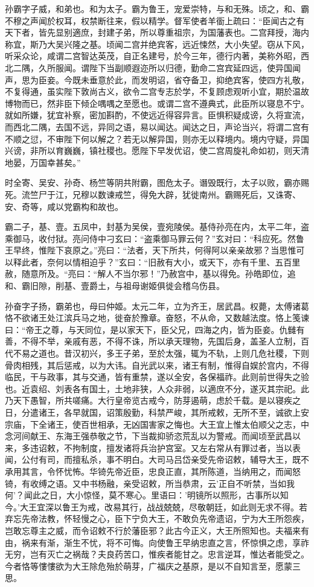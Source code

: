 \documentclass[12pt,UTF8]{ctexbook}
\begin{document}
孙霸字子威，和弟也。和为太子。霸为鲁王，宠爱崇特，与和无殊。顷之，和、霸不穆之声闻於权耳，权禁断往来，假以精学。督军使者羊衟上疏曰：“臣闻古之有天下者，皆先显别適庶，封建子弟，所以尊重祖宗，为国藩表也。二宫拜授，海内称宜，斯乃大吴兴隆之基。顷闻二宫并绝宾客，远近悚然，大小失望。窃从下风，听采众论，咸谓二宫智达英茂，自正名建号，於今三年，德行内著，美称外昭，西北二隅，久所服闻。谓陛下当副顺遐迩所以归德，勤命二宫宾延四远，使异国闻声，思为臣妾。今既未垂意於此，而发明诏，省夺备卫，抑绝宾客，使四方礼敬，不复得通，虽实陛下敦尚古义，欲令二宫专志於学，不复顾虑观听小宜，期於温故博物而已，然非臣下倾企喁喁之至愿也。或谓二宫不遵典式，此臣所以寝息不宁。就如所嫌，犹宜补察，密加斟酌，不使远近得容异言。臣惧积疑成谤，久将宣流，而西北二隅，去国不远，异同之语，易以闻达。闻达之日，声论当兴，将谓二宫有不顺之愆，不审陛下何以解之？若无以解异国，则亦无以释境内。境内守疑，异国兴谤，非所以育巍巍，镇社稷也。愿陛下早发优诏，使二宫周旋礼命如初，则天清地晏，万国幸甚矣。”

时全寄、吴安、孙奇、杨竺等阴共附霸，图危太子。谮毁既行，太子以败，霸亦赐死。流竺尸于江，兄穆以数谏戒竺，得免大辟，犹徙南州。霸赐死后，又诛寄、安、奇等，咸以党霸构和故也。

霸二子，基、壹。五凤中，封基为吴侯，壹宛陵侯。基侍孙亮在内，太平二年，盗乘御马，收付狱。亮问侍中刁玄曰：“盗乘御马罪云何？”玄对曰：“科应死。然鲁王早终，惟陛下哀原之。”亮曰：“法者，天下所共，何得阿以亲亲故邪？当思惟可以释此者，奈何以情相迫乎？”玄曰：“旧赦有大小，或天下，亦有千里、五百里赦，随意所及。“亮曰：“解人不当尔邪！”乃赦宫中，基以得免。孙皓即位，追和、霸旧隙，削基、壹爵土，与祖母谢姬俱徙会稽乌伤县。

孙奋字子扬，霸弟也，母曰仲姬。太元二年，立为齐王，居武昌。权薨，太傅诸葛恪不欲诸王处江滨兵马之地，徙奋於豫章。奋怒，不从命，又数越法度。恪上笺谏曰：“帝王之尊，与天同位，是以家天下，臣父兄，四海之内，皆为臣妾。仇雠有善，不得不举，亲戚有恶，不得不诛，所以承天理物，先国后身，盖圣人立制，百代不易之道也。昔汉初兴，多王子弟，至於太强，辄为不轨，上则几危社稷，下则骨肉相残，其后惩戒，以为大讳。自光武以来，诸王有制，惟得自娱於宫内，不得临民，干与政事，其与交通，皆有重禁，遂以全安，各保福祚。此则前世得失之验也。近袁绍、刘表各有国土，土地非狭，人众非弱，以適庶不分，遂灭其宗祀。此乃天下愚智，所共嗟痛。大行皇帝览古戒今，防芽遏萌，虑於千载。是以寝疾之日，分遣诸王，各早就国，诏策殷勤，科禁严峻，其所戒敕，无所不至，诚欲上安宗庙，下全诸王，使百世相承，无凶国害家之悔也。大王宜上惟太伯顺父之志，中念河间献王、东海王强恭敬之节，下当裁抑骄恣荒乱以为警戒。而闻顷至武昌以来，多违诏敕，不拘制度，擅发诸将兵治护宫室。又左右常从有罪过者，当以表闻，公付有司，而擅私杀，事不明白。大司马吕岱亲受先帝诏敕，辅导大王，既不承用其言，令怀忧怖。华锜先帝近臣，忠良正直，其所陈道，当纳用之，而闻怒锜，有收缚之语。又中书杨融，亲受诏敕，所当恭肃，云'正自不听禁，当如我何'？闻此之日，大小惊怪，莫不寒心。里语曰：'明镜所以照形，古事所以知今。'大王宜深以鲁王为戒，改易其行，战战兢兢，尽敬朝廷，如此则无求不得。若弃忘先帝法教，怀轻慢之心，臣下宁负大王，不敢负先帝遗诏，宁为大王所怨疾，岂敢忘尊主之威，而令诏敕不行於藩臣邪？此古今正义，大王所照知也。夫福来有由，祸来有渐，渐生不忧，将不可悔。向使鲁王早纳忠直之言，怀惊惧之虑，享祚无穷，岂有灭亡之祸哉？夫良药苦口，惟疾者能甘之。忠言逆耳，惟达者能受之。今者恪等慺慺欲为大王除危殆於萌芽，广福庆之基原，是以不自知言至，愿蒙三思。
\end{document}
